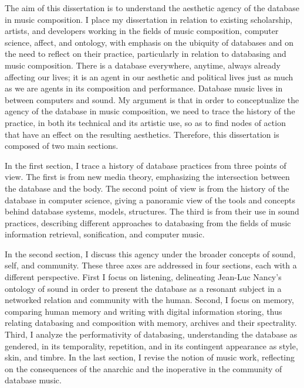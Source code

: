 The aim of this dissertation is to understand the aesthetic agency of the database in music composition. I place my dissertation in relation to existing scholarship, artists, and developers working in the fields of music composition, computer science, affect, and ontology, with emphasis on the ubiquity of databases and on the need to reflect on their practice, particularly in relation to databasing and music composition. There is a database everywhere, anytime, always already affecting our lives; it is an agent in our aesthetic and political lives just as much as we are agents in its composition and performance. Database music lives in between computers and sound. My argument is that in order to conceptualize the agency of the database in music composition, we need to trace the history of the practice, in both its technical and its artistic use, so as to find nodes of action that have an effect on the resulting aesthetics. Therefore, this dissertation is composed of two main sections.

In the first section, I trace a history of database practices from three points of view. The first is from new media theory, emphasizing the intersection between the database and the body. The second point of view is from the history of the database in computer science, giving a panoramic view of the tools and concepts behind database systems, models, structures. The third is from their use in sound practices, describing different approaches to databasing from the fields of music information retrieval, sonification, and computer music. 

In the second section, I discuss this agency under the broader concepts of sound, self, and community. These three axes are addressed in four sections, each with a different perspective. First I focus on listening, delineating Jean-Luc Nancy's ontology of sound in order to present the database as a resonant subject in a networked relation and community with the human. Second, I focus on memory, comparing human memory and writing with digital information storing, thus relating databasing and composition with memory, archives and their spectrality. Third, I analyze the performativity of databasing, understanding the database as gendered, in its temporality, repetition, and in its contingent appearance as style, skin, and timbre. In the last section, I revise the notion of music work, reflecting on the consequences of the anarchic and the inoperative in the community of database music.


